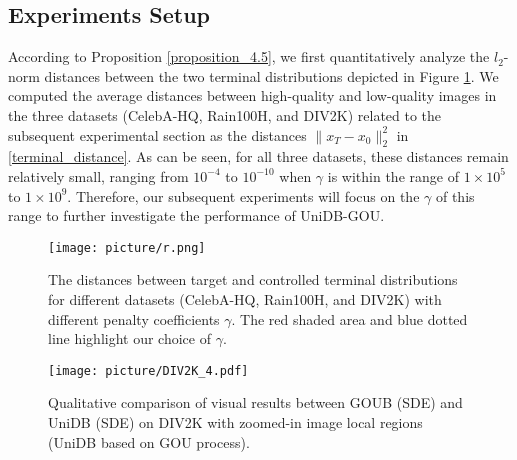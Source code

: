 \vspace{-1mm}

\subsection{Experiments Setup}

According to Proposition \ref{proposition_4.5}, we first quantitatively analyze the $l_2$-norm distances between the two terminal distributions depicted in Figure \ref{experiment_gamma_difference}. We computed the average distances between high-quality and low-quality images in the three datasets (CelebA-HQ, Rain100H, and DIV2K) related to the subsequent experimental section as the distances $\| x_T - x_0 \|^2_2$ in \eqref{terminal_distance}. As can be seen, for all three datasets, these distances remain relatively small, ranging from $10^{-4}$ to $10^{-10}$ when $\gamma$ is within the range of $1\times10^5$ to $1\times10^9$. Therefore, our subsequent experiments will focus on the $\gamma$ of this range to further investigate the performance of UniDB-GOU. 

\begin{figure}[H] 
    \raggedright
    \texttt{[image: picture/r.png]}
    \vspace{-3mm}
    \caption{The distances between target and controlled terminal distributions for different datasets (CelebA-HQ, Rain100H, and DIV2K) with different penalty coefficients $\gamma$. The red shaded area and blue dotted line highlight our choice of $\gamma$.}
    \label{experiment_gamma_difference}
    \vspace{-3mm}
\end{figure}

\begin{figure*}[t] 
    \raggedright
    \centering
    \texttt{[image: picture/DIV2K\_4.pdf]}
    \vspace{-3mm}
    \caption{Qualitative comparison of visual results between GOUB (SDE) and UniDB (SDE) on DIV2K with zoomed-in image local regions (UniDB based on GOU process).}
    \label{experiment_DIV2K}
    \vspace{-3mm}
\end{figure*}


